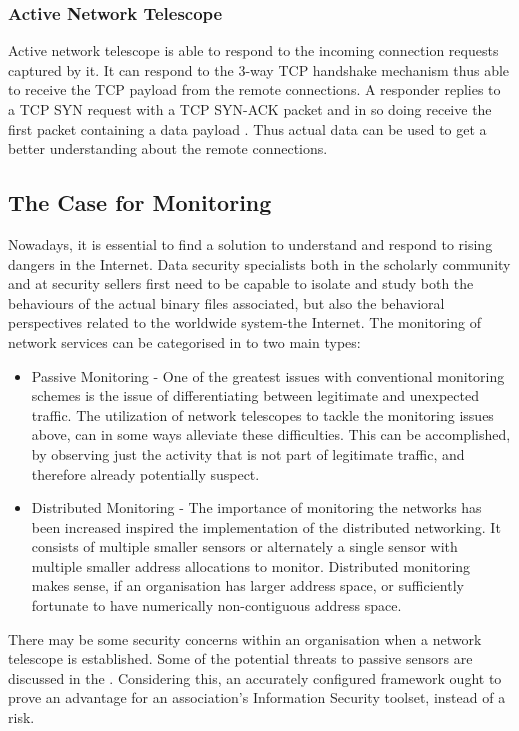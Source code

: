     \subsubsection{Active Network Telescope}
    Active network telescope is able to respond to the incoming connection requests captured by it.
    It can respond to the 3-way TCP handshake mechanism thus able to receive the TCP payload from the remote connections.
    A responder replies to a TCP SYN request with a TCP SYN-ACK packet and in so doing receive the first packet containing a data payload \cite{bailey2006practical}.
    Thus actual data can be used to get a better understanding about the remote connections.
	\subsection{The Case for Monitoring}
	Nowadays, it is essential to find a solution to understand  and respond to rising dangers in the Internet.
	Data security specialists both in the scholarly community and at security sellers first need to be capable to isolate and study both the behaviours of the actual binary files associated, but also the behavioral perspectives related to the worldwide system-the Internet.
	The monitoring of network services can be categorised in to two main types:
	\begin{itemize}
	    \item Passive Monitoring - One of the greatest issues with conventional monitoring schemes is the issue of differentiating between legitimate and unexpected traffic.
	    The utilization of network telescopes to tackle the monitoring issues above, can in some ways alleviate these difficulties.
	    This can be accomplished, by observing just the activity that is not part of legitimate traffic,  and therefore already potentially suspect. 

	    \item Distributed Monitoring - The importance of monitoring the networks has been increased inspired the implementation of the distributed networking.
	    It consists of  multiple smaller sensors or alternately a single sensor with multiple smaller address allocations to monitor.
	    Distributed monitoring makes sense, if an organisation has larger address space, or sufficiently fortunate to have numerically non-contiguous address space.
	\end{itemize}
    There may be some security concerns within an organisation when a network telescope is established.
    Some of the potential threats to passive sensors are discussed in the \cite{shinoda2005vulnerabilities}.
    Considering this, an accurately configured framework ought to prove an advantage for an association's Information Security toolset, instead of a risk.
